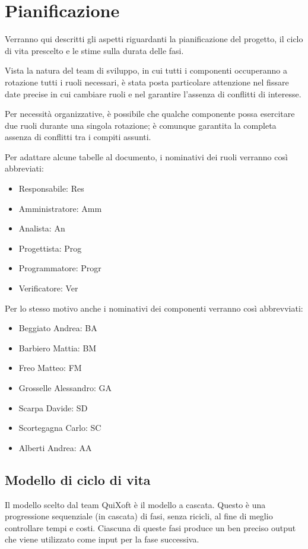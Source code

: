 \documentclass[11pt,a4paper]{article}
\begin{document}
\section{Pianificazione}
Verranno qui descritti gli aspetti riguardanti la pianificazione del progetto, il ciclo di vita prescelto e le stime sulla durata delle fasi.

Vista la natura del team di sviluppo, in cui tutti i componenti occuperanno a rotazione tutti i ruoli necessari, è stata posta particolare attenzione nel fissare date precise in cui cambiare ruoli e nel garantire l'assenza di conflitti di interesse.

Per necessità organizzative, è possibile che qualche componente possa esercitare due ruoli durante una singola rotazione; è comunque garantita la completa assenza di conflitti tra i compiti assunti.
\bigskip

Per adattare alcune tabelle al documento, i nominativi dei ruoli verranno così abbreviati:
\begin{itemize}
\item Responsabile: Res
\item Amministratore: Amm
\item Analista: An
\item Progettista: Prog
\item Programmatore: Progr
\item Verificatore: Ver
\end{itemize}
\bigskip
Per lo stesso motivo anche i nominativi dei componenti verranno così abbrevviati:
\begin{itemize}
\item Beggiato Andrea: BA
\item Barbiero Mattia: BM
\item Freo Matteo: FM
\item Grosselle Alessandro: GA
\item Scarpa Davide: SD
\item Scortegagna Carlo: SC
\item Alberti Andrea: AA
\end{itemize}
\subsection{Modello di ciclo di vita}
Il modello scelto dal team QuiXoft è il modello a cascata.
Questo è una progressione sequenziale (in cascata) di fasi, senza ricicli, al fine di meglio controllare tempi e costi.
Ciascuna di queste fasi produce un ben preciso output che viene utilizzato come input per la fase successiva.
\end{document}
